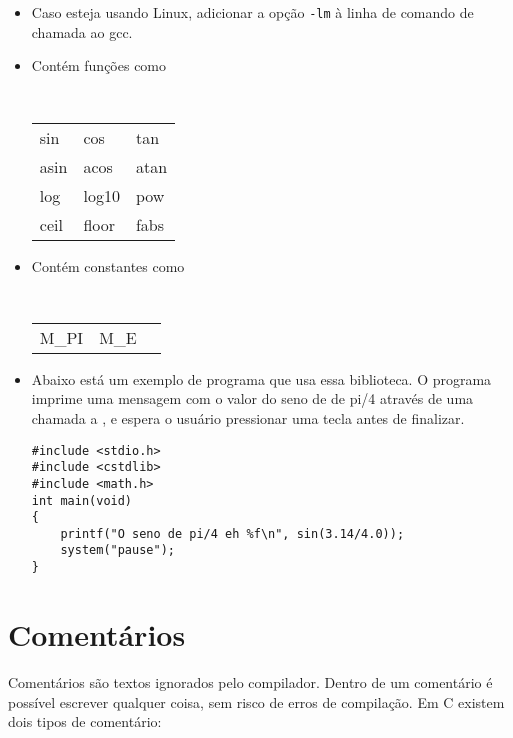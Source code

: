 \begin{itemize}

\item Caso esteja usando Linux, adicionar a opção {\tt -lm} à linha de comando de chamada ao gcc.

\item Contém funções como

{\tt
\begin{tabular}{lll}
sin      & cos      & tan     \\
asin     & acos     & atan    \\
log      & log10    & pow     \\
ceil     & floor    & fabs    \\
\end{tabular}
}

\item Contém constantes como

{\tt
\begin{tabular}{lll}
M\_PI    & M\_E     &         \\
\end{tabular}
}

\item Abaixo está um exemplo de programa que usa essa biblioteca. O programa imprime uma mensagem com o valor do seno de de pi/4 através de uma chamada a \PRINTF, e espera o usuário pressionar uma tecla antes de finalizar.

\begin{lstlisting}
#include <stdio.h>
#include <cstdlib>
#include <math.h>
int main(void)
{
    printf("O seno de pi/4 eh %f\n", sin(3.14/4.0));
    system("pause");
}
\end{lstlisting}

\end{itemize}


\section{Comentários}

Comentários são textos ignorados pelo compilador. Dentro de um comentário é possível escrever qualquer coisa, sem risco de erros de compilação. Em C existem dois tipos de comentário:

